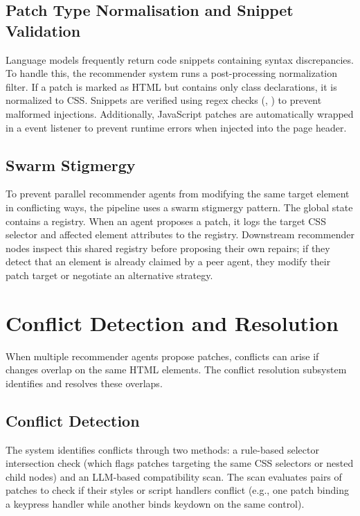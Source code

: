 \subsection{Patch Type Normalisation and Snippet Validation}
\label{sec:patch-normalisation}

Language models frequently return code snippets containing syntax discrepancies. To handle this, the recommender system runs a post-processing normalization filter. If a patch is marked as HTML but contains only class declarations, it is normalized to CSS. Snippets are verified using regex checks (, ) to prevent malformed injections. Additionally, JavaScript patches are automatically wrapped in a  event listener to prevent runtime errors when injected into the page header.

\subsection{Swarm Stigmergy}
\label{sec:swarm-claims}

To prevent parallel recommender agents from modifying the same target element in conflicting ways, the pipeline uses a swarm stigmergy pattern. The global state contains a  registry. When an agent proposes a patch, it logs the target CSS selector and affected element attributes to the registry. Downstream recommender nodes inspect this shared registry before proposing their own repairs; if they detect that an element is already claimed by a peer agent, they modify their patch target or negotiate an alternative strategy.


\section{Conflict Detection and Resolution}
\label{sec:conflict-resolution}

When multiple recommender agents propose patches, conflicts can arise if changes overlap on the same HTML elements. The conflict resolution subsystem identifies and resolves these overlaps.

\subsection{Conflict Detection}
\label{sec:conflict-detection}

The system identifies conflicts through two methods: a rule-based selector intersection check (which flags patches targeting the same CSS selectors or nested child nodes) and an LLM-based compatibility scan. The scan evaluates pairs of patches to check if their styles or script handlers conflict (e.g., one patch binding a keypress handler while another binds keydown on the same control).

